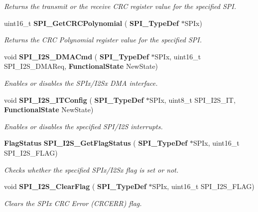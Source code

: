 \begin{DoxyCompactItemize}
\begin{DoxyCompactList}\small\item\em Returns the transmit or the receive C\+RC register value for the specified S\+PI. \end{DoxyCompactList}\item 
uint16\+\_\+t \textbf{ S\+P\+I\+\_\+\+Get\+C\+R\+C\+Polynomial} (\textbf{ S\+P\+I\+\_\+\+Type\+Def} $\ast$S\+P\+Ix)
\begin{DoxyCompactList}\small\item\em Returns the C\+RC Polynomial register value for the specified S\+PI. \end{DoxyCompactList}\item 
void \textbf{ S\+P\+I\+\_\+\+I2\+S\+\_\+\+D\+M\+A\+Cmd} (\textbf{ S\+P\+I\+\_\+\+Type\+Def} $\ast$S\+P\+Ix, uint16\+\_\+t S\+P\+I\+\_\+\+I2\+S\+\_\+\+D\+M\+A\+Req, \textbf{ Functional\+State} New\+State)
\begin{DoxyCompactList}\small\item\em Enables or disables the S\+P\+Ix/\+I2\+Sx D\+MA interface. \end{DoxyCompactList}\item 
void \textbf{ S\+P\+I\+\_\+\+I2\+S\+\_\+\+I\+T\+Config} (\textbf{ S\+P\+I\+\_\+\+Type\+Def} $\ast$S\+P\+Ix, uint8\+\_\+t S\+P\+I\+\_\+\+I2\+S\+\_\+\+IT, \textbf{ Functional\+State} New\+State)
\begin{DoxyCompactList}\small\item\em Enables or disables the specified S\+P\+I/\+I2S interrupts. \end{DoxyCompactList}\item 
\textbf{ Flag\+Status} \textbf{ S\+P\+I\+\_\+\+I2\+S\+\_\+\+Get\+Flag\+Status} (\textbf{ S\+P\+I\+\_\+\+Type\+Def} $\ast$S\+P\+Ix, uint16\+\_\+t S\+P\+I\+\_\+\+I2\+S\+\_\+\+F\+L\+AG)
\begin{DoxyCompactList}\small\item\em Checks whether the specified S\+P\+Ix/\+I2\+Sx flag is set or not. \end{DoxyCompactList}\item 
void \textbf{ S\+P\+I\+\_\+\+I2\+S\+\_\+\+Clear\+Flag} (\textbf{ S\+P\+I\+\_\+\+Type\+Def} $\ast$S\+P\+Ix, uint16\+\_\+t S\+P\+I\+\_\+\+I2\+S\+\_\+\+F\+L\+AG)
\begin{DoxyCompactList}\small\item\em Clears the S\+P\+Ix C\+RC Error (C\+R\+C\+E\+RR) flag. \end{DoxyCompactList}\item 

\end{DoxyCompactItemize}
